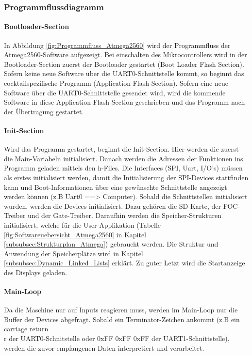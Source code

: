 \subsubsection{Programmflussdiagramm}
\label{subsubsec:Programmflussdiagramm}

\paragraph{Bootloader-Section}\mbox{}
In Abbildung \ref{fig:Programmfluss_Atmega2560} wird der Programmfluss der Atmega2560-Software aufgezeigt. Bei einschalten des Mikrocontrollers wird in der Bootloader-Section zuerst der Bootloader gestartet (Boot Loader Flash Section). Sofern keine neue Software über die UART0-Schnittstelle kommt, so beginnt das cocktailspezifische Programm (Application Flash Section). Sofern eine neue Software über die UART0-Schnittstelle gesendet wird, wird die kommende Software in diese Application Flash Section geschrieben und das Programm nach der Übertragung gestartet.

\paragraph{Init-Section}\mbox{}
Wird das Programm gestartet, beginnt die Init-Section. Hier werden die zuerst die Main-Variabeln initialisiert. Danach werden die Adressen der Funktionen ins Programm geladen mittels den h-Files. Die Interfaces (SPI, Uart, I/O's) müssen als erstes initialisiert werden, damit die Initialisierung der SPI-Devices stattfinden kann und Boot-Informationen über eine gewünschte Schnittstelle angezeigt werden können (z.B Uart0 ==> Computer). Sobald die Schnittstellen initialisiert wurden, werden die Devices initialisiert. Dazu gehören die SD-Karte, der FOC-Treiber und der Gate-Treiber. Daraufhin werden die Speicher-Strukturen initialisiert, welche für die User-Applikation (Tabelle \ref{fig:Softwareuebersicht_Atmega2560} in Kapitel \ref{subsubsec:Strukturplan_Atmega}) gebraucht werden. Die Struktur und Anwendung der Speicherplätze wird in Kapitel \ref{subsubsec:Dynamic_Linked_Lists} erklärt. Zu guter Letzt wird die Startanzeige des Displays geladen.

\paragraph{Main-Loop}

Da die Maschine nur auf Inputs reagieren muss, werden im Main-Loop nur die Buffer der Devices abgefragt. Sobald ein Terminator-Zeichen ankommt (z.B ein carriage return \\r der UART0-Schnitstelle oder 0xFF 0xFF 0xFF der UART1-Schnittstelle), werden die zuvor empfangenen Daten interpretiert und verarbeitet.
\newpage

